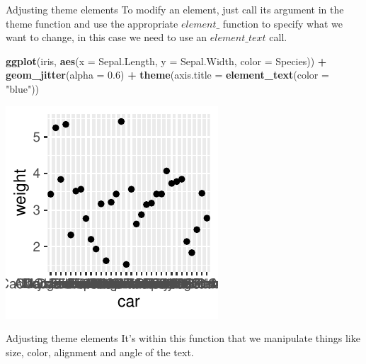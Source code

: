\documentclass[
  ignorenonframetext,
]{beamer}
\newenvironment{Shaded}{\begin{snugshade}}{\end{snugshade}}
\newcommand{\AttributeTok}[1]{\textcolor[rgb]{0.13,0.29,0.53}{#1}}
\newcommand{\FloatTok}[1]{\textcolor[rgb]{0.00,0.00,0.81}{#1}}
\newcommand{\FunctionTok}[1]{\textcolor[rgb]{0.13,0.29,0.53}{\textbf{#1}}}
\newcommand{\NormalTok}[1]{#1}
\newcommand{\SpecialCharTok}[1]{\textcolor[rgb]{0.81,0.36,0.00}{\textbf{#1}}}
\newcommand{\StringTok}[1]{\textcolor[rgb]{0.31,0.60,0.02}{#1}}
\begin{document}
\begin{frame}[fragile]{Adjusting theme elements}
\label{adjusting-theme-elements}
To modify an element, just call its argument in the theme function and
use the appropriate \(element\_\) function to specify what we want to
change, in this case we need to use an \(element\_text\) call.


\begin{Shaded}
\begin{Highlighting}[]
\FunctionTok{ggplot}\NormalTok{(iris, }\FunctionTok{aes}\NormalTok{(}\AttributeTok{x =}\NormalTok{ Sepal.Length, }\AttributeTok{y =}\NormalTok{ Sepal.Width, }\AttributeTok{color =}\NormalTok{ Species)) }\SpecialCharTok{+}
    \FunctionTok{geom\_jitter}\NormalTok{(}\AttributeTok{alpha =} \FloatTok{0.6}\NormalTok{) }\SpecialCharTok{+} \FunctionTok{theme}\NormalTok{(}\AttributeTok{axis.title =} \FunctionTok{element\_text}\NormalTok{(}\AttributeTok{color =} \StringTok{"blue"}\NormalTok{))}
\end{Highlighting}
\end{Shaded}

\begin{center}\includegraphics[width=0.5\linewidth]{Figs/unnamed-chunk-63-1} \end{center}
\end{frame}

\begin{frame}{Adjusting theme elements}
\label{adjusting-theme-elements-1}
It's within this function that we manipulate things like size, color,
alignment and angle of the text.
\end{frame}
\end{document}

